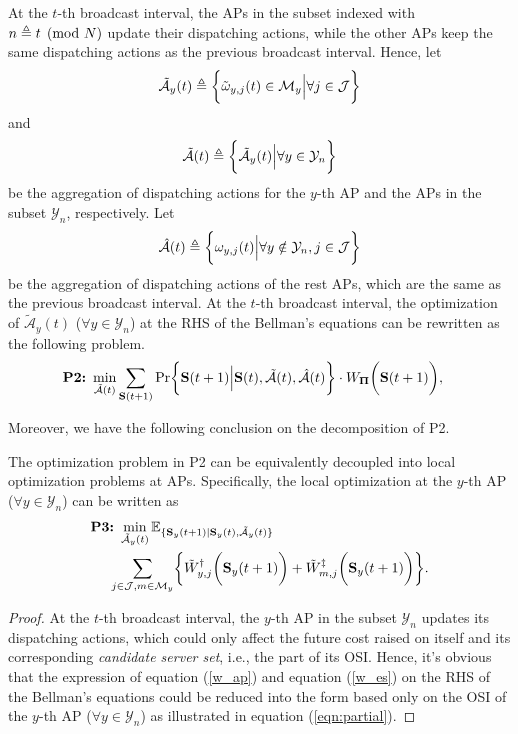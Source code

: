 At the $t$-th broadcast interval, the APs in the subset indexed with $n \triangleq t \pmod{N}$ update their dispatching actions, while the other APs keep the same dispatching actions as the previous broadcast interval.
Hence, let 
\begin{align}
    \tilde{\mathcal{A}}_{y}(t) \triangleq \bigg\{\tilde{\omega}_{y,j}(t)\in \mathcal{M}_{y} \Big| \forall j\in\mathcal{J}\bigg\}
\end{align}
and 
\begin{align}
    \tilde{\mathcal{A}}(t) \triangleq \bigg\{\tilde{\mathcal{A}}_{y}(t) \Big| \forall y\in\mathcal{Y}_{n} \bigg\}
\end{align}
be the aggregation of dispatching actions for the $y$-th AP and the APs in the subset $\mathcal{Y}_{n}$, respectively. Let
\begin{align}
    \hat{\mathcal{A}}(t) \triangleq \bigg\{\omega_{y,j}(t) \Big| \forall y\notin\mathcal{Y}_{n}, j\in\mathcal{J}\bigg\}
\end{align}
be the aggregation of dispatching actions of the rest APs, which are the same as the previous broadcast interval.
At the $t$-th broadcast interval, the optimization of $\tilde{\mathcal{A}}_{y}(t)$ ($\forall y\in\mathcal{Y}_{n}$) at the RHS of the Bellman's equations can be rewritten as the following problem.
{\small
\begin{align}
    \textbf{P2:}~
    \min_{ \tilde{\mathcal{A}}(t) }
    &\sum_{\Stat(t+1)} \Pr\Brace{
        \Stat(t+1) \Big| \Stat(t), \tilde{\mathcal{A}}(t), \hat{\mathcal{A}}(t)
    } \cdot W_{\Baseline}\Paren{\Stat(t+1)},
\end{align}
}

Moreover, we have the following conclusion on the decomposition of P2.
\begin{lemma}[]
    The optimization problem in P2 can be equivalently decoupled into local optimization problems at APs.
    Specifically, the local optimization at the $y$-th AP ($\forall y\in\mathcal{Y}_{n}$) can be written as
    \begin{align}
        &\textbf{P3:}~
        \min_{ \tilde{\mathcal{A}}_{y}(t) }
        \mathbb{E}_{\set{ \Stat_{y}(t+1)|\Stat_{y}(t), \tilde{\mathcal{A}}_{y}(t) }}
        \nonumber\\
        &~~~~\sum_{j\in\jSpace,m\in\esSet_{y}} \Brace{
            \tilde{W}^{\AP}_{y,j}\Paren{\Stat_{y}(t+1)}
            +\tilde{W}^{\ES}_{m,j}\Paren{\Stat_{y}(t+1)}
        }.
        \label{eqn:partial}
    \end{align} 
    \label{lemma:w_partial}
\end{lemma}
\begin{proof}
    At the $t$-th broadcast interval, the $y$-th AP in the subset $\mathcal{Y}_{n}$ updates its dispatching actions, which could only affect the future cost raised on itself and its corresponding \emph{candidate server set}, i.e., the part of its OSI.
    Hence, it's obvious that the expression of equation (\ref{w_ap}) and equation (\ref{w_es}) on the RHS of the Bellman's equations could be reduced into the form based only on the OSI of the $y$-th AP ($\forall y\in\mathcal{Y}_{n}$) as illustrated in equation (\ref{eqn:partial}).
\end{proof}

